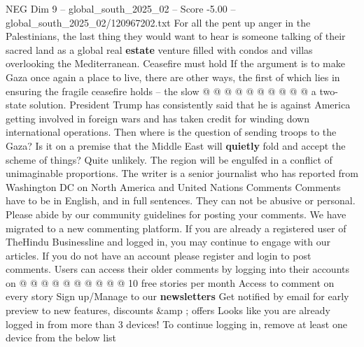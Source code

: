 \begin{textsample}{NEG Dim 9 – global\_south\_2025\_02 – Score -5.00 – global\_south\_2025\_02/120967202.txt}
For all the pent up anger in the Palestinians, the last thing they would want to hear is someone talking of their sacred land as a global real \textbf{estate} venture filled with condos and villas overlooking the Mediterranean.
Ceasefire must hold If the argument is to make Gaza once again a place to live, there are other ways, the first of which lies in ensuring the fragile ceasefire holds -- the slow @ @ @ @ @ @ @ @ @ @ a two-state solution.
President Trump has consistently said that he is against America getting involved in foreign wars and has taken credit for winding down international operations.
Then where is the question of sending troops to the Gaza?
Is it on a premise that the Middle East will \textbf{quietly} fold and accept the scheme of things?
Quite unlikely.
The region will be engulfed in a conflict of unimaginable proportions.
The writer is a senior journalist who has reported from Washington DC on North America and United Nations Comments Comments have to be in English, and in full sentences.
They can not be abusive or personal.
Please abide by our community guidelines for posting your comments.
We have migrated to a new commenting platform.
If you are already a registered user of TheHindu Businessline and logged in, you may continue to engage with our articles.
If you do not have an account please register and login to post comments.
Users can access their older comments by logging into their accounts on @ @ @ @ @ @ @ @ @ @ 10 free stories per month Access to comment on every story Sign up/Manage to our \textbf{newsletters} Get notified by email for early preview to new features, discounts \&amp ; offers Looks like you are already logged in from more than 3 devices!
To continue logging in, remove at least one device from the below list

\end{textsample}
